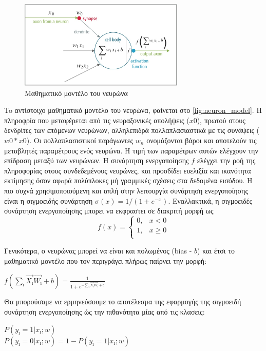 \begin{figure}[!ht]
  \centering
  \includegraphics[width=0.7\textwidth]{./images/chapter3/neuron_model.jpg}
  \caption[Μαθηματικό μοντέλο του νευρώνα]{Μαθηματικό μοντέλο του νευρώνα}
  \label{fig:neuron_model}
\end{figure}

To αντίστοιχο μαθηματικό μοντέλο του νευρώνα, φαίνεται στο \autoref{fig:neuron_model}.
H πληροφρία που μεταφέρεται από τις νευραξονικές απολήψεις ($x0$), πρωτού
στους δενδρίτες των επόμενων νευρώνων, αλληλεπιδρά πολλαπλασιαστικά με τις
συνάψεις ($w0*x0$). Oι πολλαπλασιστικοί παράγωντες $w_n$ ονομάζονται βάροι
και αποτελούν τις μεταβλητές παραμέτρους ενός νευρώνα. Η τιμή των παραμέτρων
αυτών ελέγχουν την επίδραση μεταξύ των νευρώνων. Η συνάρτηση ενεργοποίησης $f$
ελέγχει την ροή της πληροφορίας στους συνδεδεμένους νευρώνες,
και προσδίδει ευελιξία και ικανότητα εκτίμησης όσον αφoρά πολύπλοκες μή γραμμικές
σχέσεις στα δεδομένα εισόδου.
Η πιο συχνά χρησιμοποιούμενη και απλή στην λειτουργία συνάρτηση ενεργοποίησης
είναι η σιγμοειδής συνάρτηση $\sigma(x) = 1 / (1 + e^{-x})$.
Εναλλακτικά, η σιγμοειδές συνάρτηση ενεργοποίησης μπορει να εκφραστει σε διακριτή μορφή ως
\[
f(x) =
  \begin{cases}
    0, & x < 0 \\
    1, & x \geq 0 \\
  \end{cases}
\]

Γενικότερα, ο νευρώνας μπορεί να είναι και πολωμένος (bias - $b$) και έτσι το μαθηματικό
μοντέλο που τον περιγράγει πλήρως παίρνει την μορφή:
\begin{center}
\begin{large}
  $f(\sum_{\imath} \vec{X_{\imath}}\vec{W_{\imath}} + b) = \frac{1}{1 + e^{-\sum_{\imath} \vec{X_{\imath}}\vec{W_{\imath}} + b}}$
\end{large}
\end{center}
Θα μπορούσαμε να ερμηνεύσουμε το αποτέλεσμα της εφαρμογής της
σιγμοειδή συνάρτηση ενεργοποίησης ώς την πιθανότητα μίας από τις κλασεις:
\begin{center}
\begin{large}
  $P(y_{\imath} = 1 | x_{\imath};w)$ \\
  $P(y_{\imath} = 0 | x_{\imath};w) = 1 - P(y_{\imath} = 1 | x_{\imath};w)$
\end{large}
\end{center}

